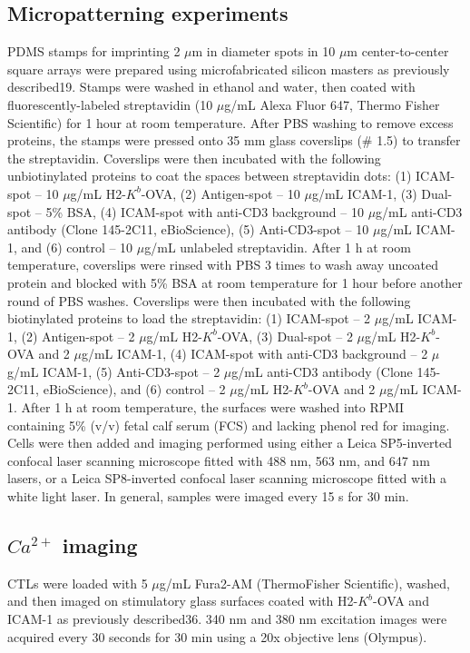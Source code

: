 \subsection{Micropatterning experiments}
PDMS stamps for imprinting 2 $\mu$m in diameter spots in 10 $\mu$m center-to-center square arrays were prepared using microfabricated silicon masters as previously described19. Stamps were washed in ethanol and water, then coated with fluorescently-labeled streptavidin (10 $\mu$g/mL Alexa Fluor 647, Thermo Fisher Scientific) for 1 hour at room temperature. After PBS washing to remove excess proteins, the stamps were pressed onto 35 mm glass coverslips (\# 1.5) to transfer the streptavidin. Coverslips were then incubated with the following unbiotinylated proteins to coat the spaces between streptavidin dots: (1) ICAM-spot – 10 $\mu$g/mL H2-$K^{b}$-OVA, (2) Antigen-spot – 10 $\mu$g/mL ICAM-1, (3) Dual-spot – 5\% BSA, (4) ICAM-spot with anti-CD3 background – 10 $\mu$g/mL anti-CD3 antibody (Clone 145-2C11, eBioScience), (5) Anti-CD3-spot – 10 $\mu$g/mL ICAM-1, and (6) control – 10 $\mu$g/mL unlabeled streptavidin. After 1 h at room temperature, coverslips were rinsed with PBS 3 times to wash away uncoated protein and blocked with 5\% BSA at room temperature for 1 hour before another round of PBS washes. Coverslips were then incubated with the following biotinylated proteins to load the streptavidin: (1) ICAM-spot – 2 $\mu$g/mL ICAM-1, (2) Antigen-spot – 2 $\mu$g/mL H2-$K^{b}$-OVA, (3) Dual-spot – 2 $\mu$g/mL H2-$K^{b}$-OVA and 2 $\mu$g/mL ICAM-1, (4) ICAM-spot with anti-CD3 background – 2 $\mu$g/mL ICAM-1, (5) Anti-CD3-spot – 2 $\mu$g/mL anti-CD3 antibody (Clone 145-2C11, eBioScience), and (6) control – 2 $\mu$g/mL H2-$K^{b}$-OVA and 2 $\mu$g/mL ICAM-1. After 1 h at room temperature, the surfaces were washed into RPMI containing 5\% (v/v) fetal calf serum (FCS) and lacking phenol red for imaging. Cells were then added and imaging performed using either a Leica SP5-inverted confocal laser scanning microscope fitted with 488 nm, 563 nm, and 647 nm lasers, or a Leica SP8-inverted confocal laser scanning microscope fitted with a white light laser. In general, samples were imaged every 15 s for 30 min. 

\subsection{$Ca^{2+}$ imaging}
CTLs were loaded with 5 $\mu$g/mL Fura2-AM (ThermoFisher Scientific), washed, and then imaged on stimulatory glass surfaces coated with H2-$K^{b}$-OVA and ICAM-1 as previously described36. 340 nm and 380 nm excitation images were acquired every 30 seconds for 30 min using a 20x objective lens (Olympus). 

